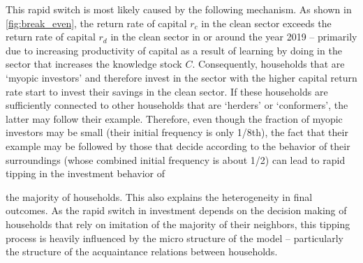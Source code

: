 This rapid switch is most likely caused by the following mechanism. As shown in \cref{fig:break_even}, the return rate of capital $r_c$ in the clean sector exceeds the return rate of capital $r_d$ in the clean sector in or around the year 2019 -- primarily due to increasing productivity of capital as a result of learning by doing in the sector that increases the knowledge stock $C$. Consequently, households that are `myopic investors' and therefore invest in the sector with the higher capital return rate start to invest their savings in the clean sector. If these households are sufficiently connected to other households that are `herders' or `conformers', the latter may follow their example. Therefore, even though the fraction of myopic investors may be small (their initial frequency is only 1/8th), the fact that their example may be followed by those that decide according to the behavior of their surroundings (whose combined initial frequency is about 1/2) can lead to rapid tipping in the investment behavior of 

the majority of households. This also explains the heterogeneity in final outcomes. As the rapid switch in investment depends on the decision making of households that rely on imitation of the majority of their neighbors, this tipping process is heavily influenced by the micro structure of the model -- particularly the structure of the acquaintance relations between households.

